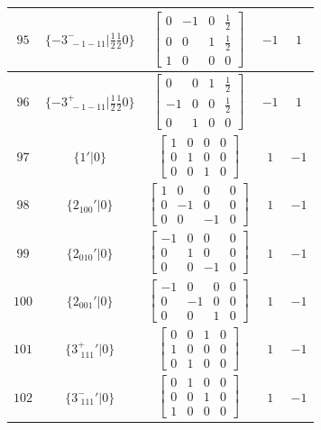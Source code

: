 \documentclass[fleqn,8pt]{jsarticle}
\begin{document}
\begin{longtable}{ccccc}
$ 95 $ & $ \{-3^{-}_{\,\,-1-11}|\frac{1}{2} \frac{1}{2} 0\} $ & $ \begin{bmatrix} 0 & -1 & 0 & \frac{1}{2} \\ 0 & 0 & 1 & \frac{1}{2} \\ 1 & 0 & 0 & 0 \end{bmatrix} $ & $ -1 $ & $ 1 $ \\ \hline
$ 96 $ & $ \{-3^{+}_{\,\,-1-11}|\frac{1}{2} \frac{1}{2} 0\} $ & $ \begin{bmatrix} 0 & 0 & 1 & \frac{1}{2} \\ -1 & 0 & 0 & \frac{1}{2} \\ 0 & 1 & 0 & 0 \end{bmatrix} $ & $ -1 $ & $ 1 $ \\ \hline
$ 97 $ & $ \{1{}'|0\} $ & $ \begin{bmatrix} 1 & 0 & 0 & 0 \\ 0 & 1 & 0 & 0 \\ 0 & 0 & 1 & 0 \end{bmatrix} $ & $ 1 $ & $ -1 $ \\ \hline
$ 98 $ & $ \{2{}_{100}{}'|0\} $ & $ \begin{bmatrix} 1 & 0 & 0 & 0 \\ 0 & -1 & 0 & 0 \\ 0 & 0 & -1 & 0 \end{bmatrix} $ & $ 1 $ & $ -1 $ \\ \hline
$ 99 $ & $ \{2{}_{010}{}'|0\} $ & $ \begin{bmatrix} -1 & 0 & 0 & 0 \\ 0 & 1 & 0 & 0 \\ 0 & 0 & -1 & 0 \end{bmatrix} $ & $ 1 $ & $ -1 $ \\ \hline
$ 100 $ & $ \{2{}_{001}{}'|0\} $ & $ \begin{bmatrix} -1 & 0 & 0 & 0 \\ 0 & -1 & 0 & 0 \\ 0 & 0 & 1 & 0 \end{bmatrix} $ & $ 1 $ & $ -1 $ \\ \hline
$ 101 $ & $ \{3^{+}_{\,\,111}{}'|0\} $ & $ \begin{bmatrix} 0 & 0 & 1 & 0 \\ 1 & 0 & 0 & 0 \\ 0 & 1 & 0 & 0 \end{bmatrix} $ & $ 1 $ & $ -1 $ \\ \hline
$ 102 $ & $ \{3^{-}_{\,\,111}{}'|0\} $ & $ \begin{bmatrix} 0 & 1 & 0 & 0 \\ 0 & 0 & 1 & 0 \\ 1 & 0 & 0 & 0 \end{bmatrix} $ & $ 1 $ & $ -1 $ \\ \hline

\end{longtable}
\end{document}
